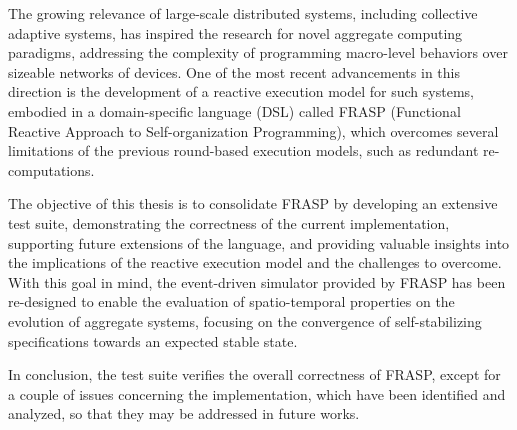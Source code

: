 
The growing relevance of large-scale distributed systems, including collective
adaptive systems, has inspired the research for novel aggregate computing
paradigms, addressing the complexity of programming macro-level behaviors over
sizeable networks of devices. One of the most recent advancements in this
direction is the development of a reactive execution model for such systems,
embodied in a domain-specific language (DSL) called FRASP (Functional Reactive
Approach to Self-organization Programming), which overcomes several limitations
of the previous round-based execution models, such as redundant
re-computations.

The objective of this thesis is to consolidate FRASP by developing an extensive
test suite, demonstrating the correctness of the current implementation,
supporting future extensions of the language, and providing valuable insights
into the implications of the reactive execution model and the challenges to
overcome. With this goal in mind, the event-driven simulator provided by FRASP
has been re-designed to enable the evaluation of spatio-temporal properties on
the evolution of aggregate systems, focusing on the convergence of
self-stabilizing specifications towards an expected stable state.

In conclusion, the test suite verifies the overall correctness of FRASP, except
for a couple of issues concerning the implementation, which have been
identified and analyzed, so that they may be addressed in future works.